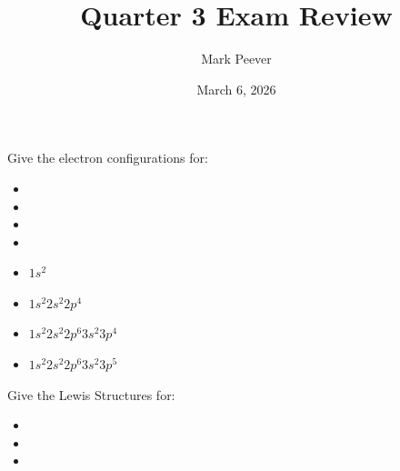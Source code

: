 \documentclass[11pt,addpoints]{exam}   	%
\title{Quarter 3 Exam Review}
\author{Mark Peever}
\date{March 6, 2026}							%
\begin{document}
\maketitle

\pointsinrightmargin
\printanswers

\begin{center}
\end{center}
\vspace{0.1in}
\vspace{0.2in}

\begin{questions}

\question[5] Give the electron configurations for:
\begin{itemize}
\item {}
\item {}
\item {}
\item {}
\end{itemize}

\begin{solution}
\begin{itemize}
\item $1s^{2} $
\item $1s^{2} 2s^{2} 2p^{4} $
\item $1s^{2} 2s^{2} 2p^{6} 3s^{2} 3p^{4}$
\item $1s^{2} 2s^{2} 2p^{6} 3s^{2} 3p^{5}$
\end{itemize}
\end{solution}

\clearpage
\question[5] 
Give the Lewis Structures for:
\begin{itemize}
\item {}
\item {}
\item {}
\end{itemize}


\end{questions}
\end{document}
